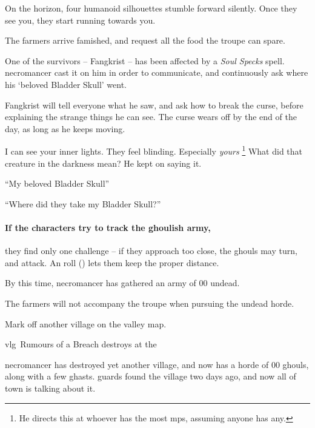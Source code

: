 \begin{boxtext}
  On the horizon, four humanoid silhouettes stumble forward silently.
  Once they see you, they start running towards you.
\end{boxtext}

The farmers arrive famished, and request all the food the troupe can spare.

One of the survivors -- Fangkrist -- has been affected by a \textit{Soul Specks} spell.
\Gls{necromancer} cast it on him in order to communicate, and continuously ask where his `beloved Bladder Skull' went.

Fangkrist will tell everyone what he saw, and ask how to break the curse, before explaining the strange things he can see.
The curse wears off by the end of the day, as long as he keeps moving.

\begin{speechtext}
  I can see your inner lights.
  They feel blinding.
  Especially \emph{yours}%
  \footnote{He directs this at whoever has the most \glspl{mp}, assuming anyone has any.}
  What did that creature in the darkness mean?
  He kept on saying it.

  ``My beloved Bladder Skull''

  ``Where did they take my Bladder Skull?''
\end{speechtext}

\paragraph{If the characters try to track the ghoulish army,}
they find only one challenge -- if they approach too close, the ghouls may turn, and attack.
An  roll (\tn[10]) lets them keep the proper distance.

By this time, \gls{necromancer} has gathered an army of 00 undead.

The farmers will not accompany the troupe when pursuing the undead horde.

Mark off another \gls{village} on the \gls{valley} map.


{\gls{vlg}~\squash Rumours of a Breach}%
{ destroys  at the }%

\Gls{necromancer} has destroyed yet another \gls{village}, and now has a horde of 00 ghouls, along with a few ghasts.
\Glspl{guard} found the \gls{village} two days ago, and now all of \gls{town} is talking about it.

